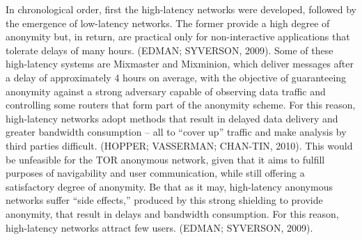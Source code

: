 In chronological order, first the high-latency networks were developed, followed by the emergence of low-latency networks. The former provide a high degree of anonymity but, in return, are practical only for non-interactive applications that tolerate delays of many hours. (EDMAN; SYVERSON, 2009). Some of these high-latency systems are Mixmaster and Mixminion, which deliver messages after a delay of approximately 4 hours on average, with the objective of guaranteeing anonymity against a strong adversary capable of observing data traffic and controlling some routers that form part of the anonymity scheme. For this reason, high-latency networks adopt methods that result in delayed data delivery and greater bandwidth consumption -- all to ``cover up'' traffic and make analysis by third parties difficult. (HOPPER; VASSERMAN; CHAN-TIN, 2010). This would be unfeasible for the TOR anonymous network, given that it aims to fulfill purposes of navigability and user communication, while still offering a satisfactory degree of anonymity. Be that as it may, high-latency anonymous networks suffer ``side effects,'' produced by this strong shielding to provide anonymity, that result in delays and bandwidth consumption. For this reason, high-latency networks attract few users. (EDMAN; SYVERSON, 2009).

